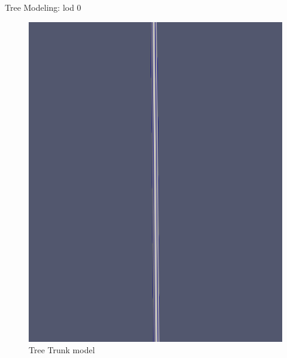 \documentclass[10pt]{beamer}
\begin{document}
\begin{frame}{Tree Modeling: lod 0}
	\begin{figure}[h]
		\centering
		\begin{minipage}{0.49\textwidth}
			\centering
			\includegraphics[width=\textwidth]{images/tree-trunk.png}
			\caption{Tree Trunk model}
			\label{fig:figure1}
		\end{minipage}\hfill
		\begin{minipage}{0.49\textwidth}
			\centering

\end{minipage}
\end{figure}
\end{frame}
\end{document}
